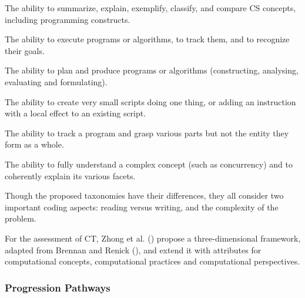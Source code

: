 \begin{description}[leftmargin=1em]
\item[Understanding:] The ability to summarize, explain, exemplify,
    classify, and compare CS concepts, including programming constructs.
\item[Applying:] The ability to execute programs or algorithms, to track
    them, and to recognize their goals.
\item[Creating:] The ability to plan and produce programs or algorithms
    (constructing, analysing, evaluating and formulating).
\item[Unistructural:] The ability to create very small scripts doing one
    thing, or adding an instruction with a local effect to an existing
    script.
\item[Multistructural:] The ability to track a program and grasp various
    parts but not the entity they form as a whole.
\item[Relational:] The ability to fully understand a complex concept (such
    as concurrency) and to coherently explain its various facets.
\end{description}



Though the proposed taxonomies have their differences, they all consider two important coding aspects: reading versus writing, and the complexity of the problem.

For the assessment of CT, Zhong et al. (\cite{Zhong2016}) propose a three-dimensional framework, adapted from Brennan and Renick (\cite{BrennanResnick2012}), and extend it with attributes for computational concepts, computational practices and computational perspectives.


\subsubsection*{Progression Pathways}



